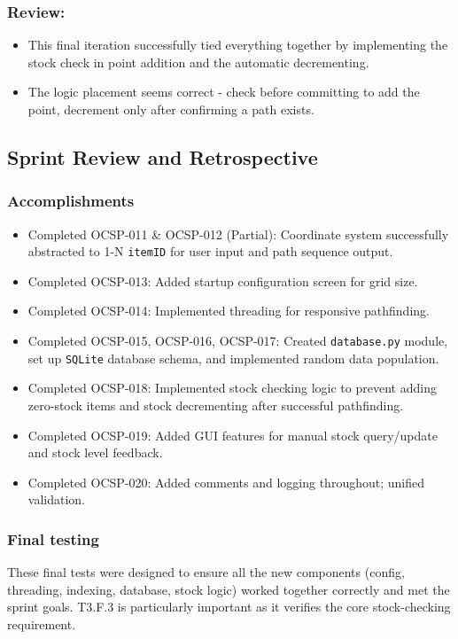 \subsubsection{Review:}
\begin{itemize}
	\item This final iteration successfully tied everything together by implementing the stock check in point addition and the automatic decrementing.
	\item The logic placement seems correct - check before committing to add the point, decrement only after confirming a path exists.
\end{itemize}

\clearpage
\subsection{Sprint Review and Retrospective}

\subsubsection{Accomplishments}
\begin{itemize}
	\item Completed OCSP-011 \& OCSP-012 (Partial): Coordinate system successfully abstracted to 1-N \verb|itemID| for user input and path sequence output.
	\item Completed OCSP-013: Added startup configuration screen for grid size.
	\item Completed OCSP-014: Implemented threading for responsive pathfinding.
	\item Completed OCSP-015, OCSP-016, OCSP-017: Created \verb|database.py| module, set up \verb|SQLite| database schema, and implemented random data population.
	\item Completed OCSP-018: Implemented stock checking logic to prevent adding zero-stock items and stock decrementing after successful pathfinding.
	\item Completed OCSP-019: Added GUI features for manual stock query/update and stock level feedback.
	\item Completed OCSP-020: Added comments and logging throughout; unified validation.
\end{itemize}

\subsubsection{Final testing}
These final tests were designed to ensure all the new components (config, threading, indexing, database, stock logic) worked together correctly and met the sprint goals. T3.F.3 is particularly important as it verifies the core stock-checking requirement.

